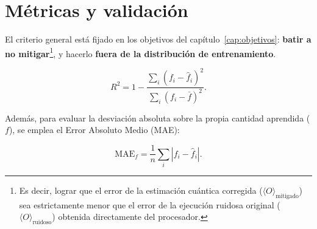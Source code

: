 \section{Métricas y validación}
\label{sec:criterios}
%
%
%
El criterio general está fijado en los objetivos del capítulo~\ref{cap:objetivos}: \textbf{batir
a no mitigar}\footnote{Es decir, lograr que el error de la estimación cuántica corregida ($\langle O\rangle_{\text{mitigado}}$) sea estrictamente menor que el error de la ejecución ruidosa original ($\langle O\rangle_{\text{ruidoso}}$) obtenida directamente del procesador.}, y hacerlo \textbf{fuera de la distribución de entrenamiento}. 

\label{sec:metrica_decide}%

\begin{center}
\end{center}

\begin{equation}
\label{eq:metrica_r}
R^2 = 1 - \frac{\sum_i (f_i - \hat f_i)^2}{\sum_i (f_i - \bar f)^2}.
\end{equation}

Además, para evaluar la desviación absoluta sobre la propia cantidad aprendida ($f$), se emplea el Error Absoluto Medio (MAE):

\begin{equation}
\label{eq:metrica_mae}
\text{MAE}_f = \frac{1}{n}\sum_i \left| f_i - \hat f_i \right| .
\end{equation}

